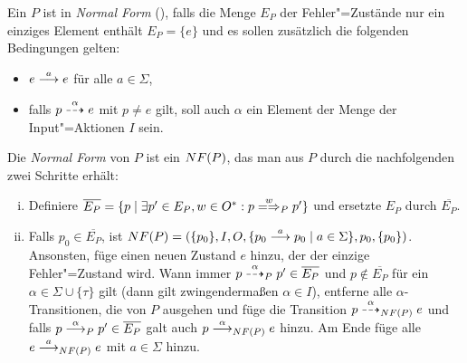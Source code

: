 \begin{Def}
  \label{normalFormDef}
  Ein \MEIO{} $P$ ist in \emph{Normal Form} (\NF{}), falls die Menge $E_P$ der
  Fehler"=Zustände nur ein einziges Element enthält $E_P=\{e\}$ und es sollen
  zusätzlich die folgenden Bedingungen gelten:
  \begin{itemize}
    \item $e \must[a] e$ für alle $a\in\Sigma$,
    \item falls $p \may[\alpha] e$ mit $p\neq e$ gilt, soll auch $\alpha$ ein
      Element der Menge der Input"=Aktionen $I$ sein.
  \end{itemize}
  Die \emph{Normal Form} von $P$ ist ein \MEIO{} $NF (P)$, das man aus $P$
  durch die nachfolgenden zwei Schritte erhält:
  \begin{enumerate}[(i)]
    \item Definiere $\overline{E_P} = \{p \mid \exists p'\in E_P, w\in O^*:
      p\weakmay[w]_P p'\}$ und ersetzte $E_P$ durch $\overline{E_P}$.
    \item Falls $p_0\in \overline{E_P}$, ist $NF(P) = (\{p_0\}, I, O, \{p_0
      \must[a] p_0 \mid a\in\Sigma\}, p_0, \{p_0\})$.\\
      Ansonsten, füge einen neuen Zustand $e$ hinzu, der der einzige
      Fehler"=Zustand wird. Wann immer $p \may[\alpha]_P p'\in \overline{E_P}$
      und $p\notin \overline{E_P}$ für ein $\alpha\in \Sigma \cup \{\tau\}$
      gilt (dann gilt zwingendermaßen $\alpha \in I$), entferne alle
      $\alpha$-Transitionen, die von $P$ ausgehen und füge die Transition
      $p\may[\alpha]_{\NF (P)} e$ und falls $p \must[\alpha]_P p'\in
      \overline{E_P}$ galt auch $p \must[\alpha]_{\NF (P)} e$ hinzu. Am Ende
      füge alle $e\must[a]_{\NF (P)} e$ mit $a\in\Sigma$ hinzu.
  \end{enumerate}
\end{Def}

